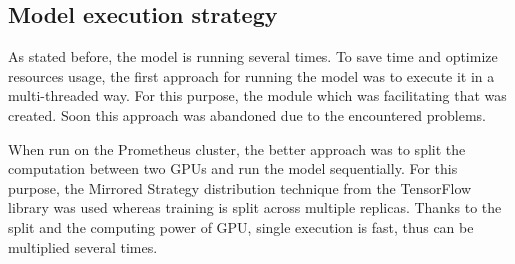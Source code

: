 \subsection{Model execution strategy}\label{subsec:model-execution-strategy}
As stated before, the model is running several times.
To save time and optimize resources usage, the first approach for running the model was to execute it in a multi-threaded way.
For this purpose, the module which was facilitating that was created.
Soon this approach was abandoned due to the encountered problems.

When run on the Prometheus cluster, the better approach was to split the computation between two GPUs and run the model sequentially.
For this purpose, the Mirrored Strategy distribution technique from the TensorFlow library was used whereas training is split across multiple replicas.
Thanks to the split and the computing power of GPU, single execution is fast, thus can be multiplied several times.
